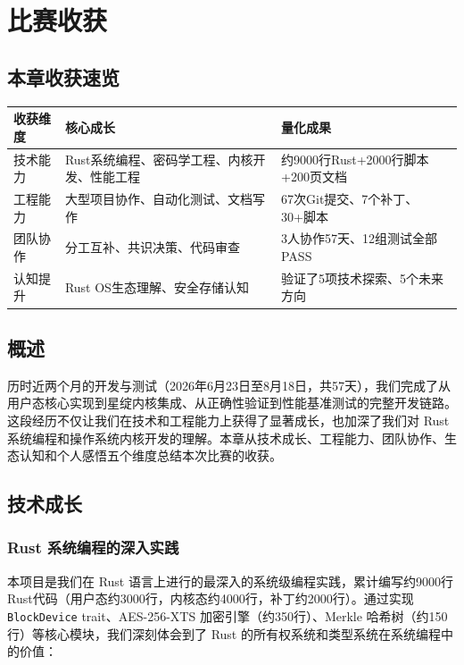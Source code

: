\chapter{比赛收获}

\section*{本章收获速览}

\begin{table}[H]
    \centering
    \begin{tabular}{p{}p{}p{}}
        \toprule
        \textbf{收获维度} & \textbf{核心成长} & \textbf{量化成果} \\
        \midrule
        技术能力 & Rust系统编程、密码学工程、内核开发、性能工程 & 约9000行Rust+2000行脚本+200页文档 \\
        工程能力 & 大型项目协作、自动化测试、文档写作 & 67次Git提交、7个补丁、30+脚本 \\
        团队协作 & 分工互补、共识决策、代码审查 & 3人协作57天、12组测试全部PASS \\
        认知提升 & Rust OS生态理解、安全存储认知 & 验证了5项技术探索、5个未来方向 \\
        \bottomrule
    \end{tabular}
\end{table}

\section{概述}

历时近两个月的开发与测试（2026年6月23日至8月18日，共57天），我们完成了从用户态核心实现到星绽内核集成、从正确性验证到性能基准测试的完整开发链路。这段经历不仅让我们在技术和工程能力上获得了显著成长，也加深了我们对 Rust 系统编程和操作系统内核开发的理解。本章从技术成长、工程能力、团队协作、生态认知和个人感悟五个维度总结本次比赛的收获。

\section{技术成长}

\subsection{Rust 系统编程的深入实践}

本项目是我们在 Rust 语言上进行的最深入的系统级编程实践，累计编写约9000行Rust代码（用户态约3000行，内核态约4000行，补丁约2000行）。通过实现 \texttt{BlockDevice} trait、AES-256-XTS 加密引擎（约350行）、Merkle 哈希树（约150行）等核心模块，我们深刻体会到了 Rust 的所有权系统和类型系统在系统编程中的价值：

